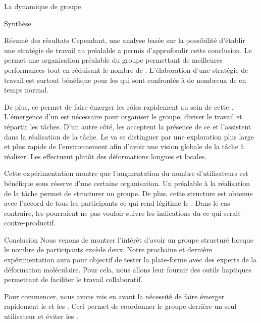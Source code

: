 \documentclass[myfrancais]{mythesis}
\begin{document}
\begin{mychapter}{La dynamique de groupe}
\begin{mysection}{Synthèse}
\begin{mysubsection}{Résumé des résultats}
				Cependant, une analyse basée sur la possibilité d'établir une stratégie de travail au préalable a permis d'approfondir cette conclusion.
				Le \mybrainstorming permet une organisation préalable du groupe permettant de meilleures performances tout en réduisant le nombre de .
				L'élaboration d'une stratégie de travail est surtout bénéfique pour les  qui sont confrontés à de nombreux de  en temps normal.

				De plus, ce \mybrainstorming permet de faire émerger les rôles rapidement au sein de cette .
				L'émergence d'un  est nécessaire pour organiser le groupe, diviser le travail et répartir les tâches.
				D'un autre côté, les  acceptent la présence de ce  et l'assistent dans la réalisation de la tâche.
				Le  va se distinguer par une exploration plus large et plus rapide de l'environnement afin d'avoir une vision globale de la tâche à réaliser.
				Les  effectuent plutôt des déformations longues et locales.

				Cette expérimentation montre que l'augmentation du nombre d'utilisateurs est bénéfique sous réserve d'une certaine organisation.
				Un \mybrainstorming préalable à la réalisation de la tâche permet de structurer un groupe.
				De plus, cette structure est obtenue avec l'accord de tous les participants ce qui rend légitime le .
				Dans le cas contraire, les  pourraient ne pas vouloir suivre les indications du  ce qui serait contre-productif.
			\end{mysubsection}
			\begin{mysubsection}{Conclusion}
				Nous venons de montrer l'intérêt d'avoir un groupe structuré lorsque le nombre de participants excède deux.
				Notre prochaine et dernière expérimentation aura pour objectif de tester la plate-forme avec des experts de la déformation moléculaire.
				Pour cela, nous allons leur fournir des outils haptiques permettant de faciliter le travail collaboratif.

				Pour commencer, nous avons mis en avant la nécessité de faire émerger rapidement le  et les .
				Ceci permet de coordonner le groupe derrière un seul utilisateur et éviter les .


\end{mysubsection}
\end{mysection}
\end{mychapter}
\end{document}
